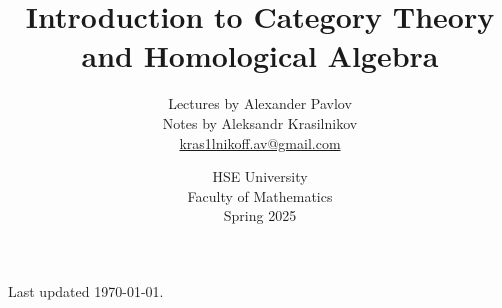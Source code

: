 \documentclass[11pt, article]{memoir}
\begin{document}

\frontmatter
{}

\title{Introduction to Category Theory and Homological Algebra}
\author{Lectures by Alexander Pavlov \\ Notes by Aleksandr Krasilnikov \\
		\href{mailto:kras1lnikoff.av@gmail.com}{kras1lnikoff.av@gmail.com}}
\date{HSE University \\ Faculty of Mathematics \\ Spring 2025}

\maketitle

\tableofcontents*

\newpage

\listoflectures*

\vspace*{\fill}

\begin{center}
	\small Last updated \today.
\end{center}

\mainmatter
\pagestyle{lecture}















\end{document}

